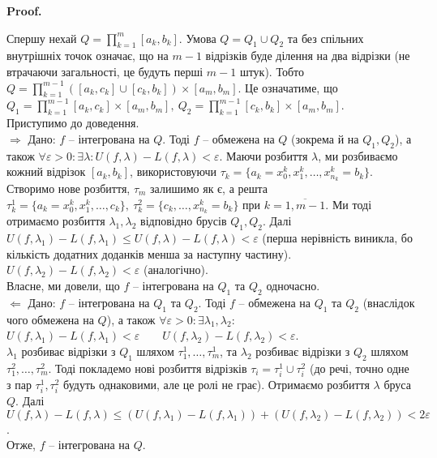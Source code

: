 \documentclass[a4paper, 10pt]{article}
\makeatletter
\def\qed{$\blacksquare$}
\def\rightproof{$\boxed{\Rightarrow}$ }
\def\leftproof{$\boxed{\Leftarrow}$ }
\theoremstyle{theoremdd}
\theoremstyle{theoremdd}
\theoremstyle{theoremdd}
\theoremstyle{theoremdd}
\theoremstyle{theoremdd}
\theoremstyle{theoremdd}
\theoremstyle{theoremdd}
\theoremstyle{theoremdd}
\renewenvironment{proof}[1][Proof.\\]{\par
\pushQED{\hfill \qed}%
\normalfont \topsep6\p@\@plus6\p@\relax
\trivlist
\item\relax
{\bfseries
#1\@addpunct{.}}\hspace\labelsep\ignorespaces
}{%
\popQED\endtrivlist\@endpefalse
}
\makeatother
\begin{document}
\begin{proof}
Спершу нехай $Q = \displaystyle\prod_{k=1}^m [a_k,b_k]$. Умова $Q = Q_1 \cup Q_2$ та без спільних внутрішніх точок означає, що на $m-1$ відрізків буде ділення на два відрізки (не втрачаючи загальності, це будуть перші $m-1$ штук). Тобто $Q = \displaystyle\prod_{k=1}^{m-1} \left([a_k,c_k] \cup [c_k,b_k]\right) \times [a_m,b_m]$. Це означатиме, що\\
$Q_1 = \displaystyle\prod_{k=1}^{m-1} [a_k,c_k] \times [a_m,b_m],\ Q_2 = \displaystyle\prod_{k=1}^{m-1} [c_k,b_k] \times [a_m,b_m]$.\\
Приступимо до доведення.
\bigskip \\
\rightproof Дано: $f$ -- інтегрована на $Q$. Тоді $f$ -- обмежена на $Q$ (зокрема й на $Q_1,Q_2$), а також $\forall \varepsilon > 0: \exists \lambda: U(f,\lambda) - L(f,\lambda) < \varepsilon$. Маючи розбиття $\lambda$, ми розбиваємо кожний відрізок $[a_k,b_k]$, використовуючи $\tau_k = \{a_k = x_0^k, x_1^k, \dots, x_{n_k}^k = b_k\}$.\\
Створимо нове розбиття, $\tau_m$ залишимо як є, а решта $\tau_k^{1} = \{a_k = x_0^k, x_1^k, \dots, c_k\},\ \tau_k^{2} = \{c_k, \dots, x_{n_k}^k = b_k\}$ при $k = \overline{1,m-1}$. Ми тоді отримаємо розбиття $\lambda_1, \lambda_2$ відповідно брусів $Q_1,Q_2$. Далі\\
$U(f,\lambda_1) - L(f,\lambda_1) \leq U(f,\lambda) - L(f,\lambda) < \varepsilon$ (перша нерівність виникла, бо кількість додатних доданків менша за наступну частину).\\
$U(f,\lambda_2) - L(f,\lambda_2) < \varepsilon$ (аналогічно).\\
Власне, ми довели, що $f$ -- інтегрована на $Q_1$ та $Q_2$ одночасно.
\bigskip \\
\leftproof Дано: $f$ -- інтегрована на $Q_1$ та $Q_2$. Тоді $f$ -- обмежена на $Q_1$ та $Q_2$ (внаслідок чого обмежена на $Q$), а також $\forall \varepsilon > 0: \exists \lambda_1,\lambda_2:$\\
$U(f,\lambda_1) - L(f,\lambda_1) < \varepsilon \qquad U(f,\lambda_2) - L(f,\lambda_2) < \varepsilon$.\\
$\lambda_1$ розбиває відрізки з $Q_1$ шляхом $\tau_1^1,\dots,\tau_m^1$, та $\lambda_2$ розбиває відрізки з $Q_2$ шляхом $\tau_1^2,\dots,\tau_m^2$. Тоді покладемо нові розбиття відрізків $\tau_i = \tau_i^1 \cup \tau_i^2$ (до речі, точно одне з пар $\tau_i^1,\tau_i^2$ будуть однаковими, але це ролі не грає). Отримаємо розбиття $\lambda$ бруса $Q$. Далі\\
$U(f,\lambda) - L(f,\lambda) \leq (U(f,\lambda_1) - L(f,\lambda_1)) + (U(f,\lambda_2) - L(f,\lambda_2)) < 2 \varepsilon$.\\
Отже, $f$ -- інтегрована на $Q$.
\end{proof}
\end{document}
